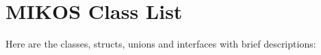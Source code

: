 \section{MIKOS Class List}
Here are the classes, structs, unions and interfaces with brief descriptions:\begin{CompactList}
\item{}
\item{}
\end{CompactList}
